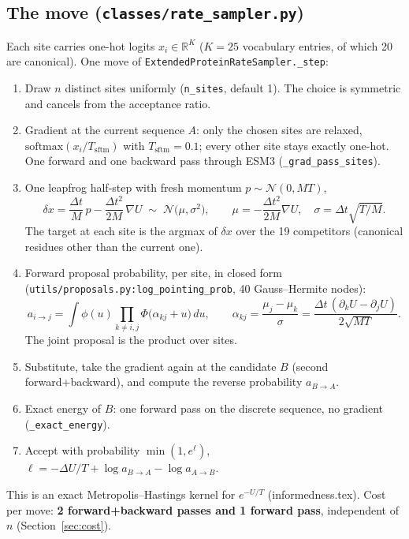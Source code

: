 \documentclass[11pt,a4paper]{article}
\newcommand{\dt}{\Delta t}
\newcommand{\gradU}{\nabla U}
\newcommand{\Mass}{M}
\newcommand{\Tsftm}{T_{\mathrm{sftm}}}
\newcommand{\file}[1]{\texttt{#1}}
\begin{document}
\subsection{The move (\file{classes/rate\_sampler.py})}
Each site carries one-hot logits $x_i\in\mathbb{R}^{K}$ ($K=25$ vocabulary
entries, of which 20 are canonical). One move of
\texttt{ExtendedProteinRateSampler.\_step}:
\begin{enumerate}
  \item Draw $n$ distinct sites uniformly (\texttt{n\_sites}, default 1). The
        choice is symmetric and cancels from the acceptance ratio.
  \item Gradient at the current sequence $A$: only the chosen sites are relaxed,
        $\mathrm{softmax}(x_i/\Tsftm)$ with $\Tsftm=0.1$; every other site stays
        exactly one-hot. One forward and one backward pass through ESM3
        (\texttt{\_grad\_pass\_sites}).
  \item One leapfrog half-step with fresh momentum $p\sim\mathcal N(0,\Mass T)$,
        \begin{equation}
          \delta x = \frac{\dt}{\Mass}\,p - \frac{\dt^2}{2\Mass}\,\gradU
          \;\sim\; \mathcal N\!\bigl(\mu,\sigma^2\bigr),\qquad
          \mu=-\frac{\dt^2}{2\Mass}\gradU,\quad \sigma=\dt\sqrt{T/\Mass}.
        \end{equation}
        The target at each site is the argmax of $\delta x$ over the 19
        competitors (canonical residues other than the current one).
  \item Forward proposal probability, per site, in closed form
        (\file{utils/proposals.py:log\_pointing\_prob}, 40 Gauss--Hermite nodes):
        \begin{equation}
          a_{i\to j}=\int\!\phi(u)\prod_{k\ne i,j}\Phi\!\bigl(\alpha_{kj}+u\bigr)\,du,
          \qquad \alpha_{kj}=\frac{\mu_j-\mu_k}{\sigma}=\frac{\dt\,(\partial_k U-\partial_j U)}{2\sqrt{\Mass T}} .
        \end{equation}
        The joint proposal is the product over sites.
  \item Substitute, take the gradient again at the candidate $B$ (second
        forward+backward), and compute the reverse probability $a_{B\to A}$.
  \item Exact energy of $B$: one forward pass on the discrete sequence, no
        gradient (\texttt{\_exact\_energy}).
  \item Accept with probability $\min(1,e^{\ell})$,
        $\ell = -\Delta U/T + \log a_{B\to A} - \log a_{A\to B}$.
\end{enumerate}
This is an exact Metropolis--Hastings kernel for $e^{-U/T}$
(informedness.tex). Cost per move: \textbf{2 forward+backward passes and 1
forward pass}, independent of $n$ (Section~\ref{sec:cost}).
\end{document}
